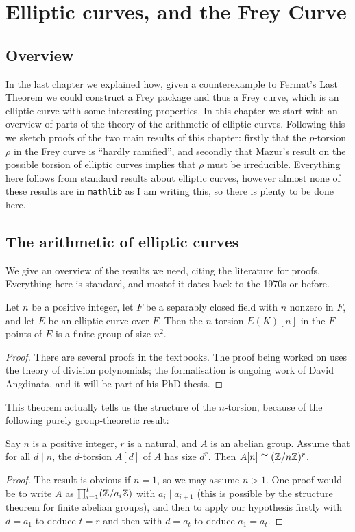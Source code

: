 \chapter{Elliptic curves, and the Frey Curve}

\section{Overview}

In the last chapter we explained how, given a counterexample to Fermat's Last Theorem we could construct a Frey package and thus a Frey curve, which is an elliptic curve with some interesting properties. In this chapter we start with an overview of parts of the theory of the arithmetic of elliptic curves. Following
this we sketch proofs of the two main results of this chapter: firstly that the $p$-torsion $\rho$ in the Frey curve is ``hardly ramified'', and secondly that Mazur's result on the possible torsion of elliptic curves implies that $\rho$ must be irreducible. Everything here follows from standard results about elliptic curves, however almost none of these results are in {\tt mathlib} as I am writing this, so there is plenty to be done here.

\section{The arithmetic of elliptic curves}

We give an overview of the results we need, citing the literature for proofs. Everything here is
 standard, and mostof it dates back to the 1970s or before.

\begin{theorem}\label{EllipticCurve.n_torsion_card}\notready
  Let $n$ be a positive integer, let $F$ be a separably closed
  field with $n$ nonzero in $F$, and let $E$ be an elliptic curve over $F$. Then the $n$-torsion $E(K)[n]$ 
  in the $F$-points of $E$ is a finite group of size $n^2$.
\end{theorem}
\begin{proof}
  There are several proofs in the textbooks. The proof being worked on uses the theory of division polynomials; the formalisation is ongoing work of David Angdinata, and it will be part of his PhD thesis.
\end{proof}

This theorem actually tells us the structure of the $n$-torsion, because of the following
purely group-theoretic result:
\begin{lemma}\label{group_theory_lemma}
  Say $n$ is a positive integer, $r$ is a natural, and $A$ is an abelian group. Assume that for all $d\mid n$, the $d$-torsion $A[d]$ of $A$ has size $d^r$. Then $A[n]\cong (\mathbb{Z}/n\mathbb{Z})^r$. 
\end{lemma}
\begin{proof}
  The result is obvious if $n=1$, so we may assume $n>1$. One proof would be to write $A$ as $\prod_{i=1}^t(\mathbb{Z}/a_i\mathbb{Z})$
  with $a_i\mid a_{i+1}$ (this is possible by the structure theorem for finite abelian groups), and then to apply our hypothesis firstly with $d=a_1$ to deduce $t=r$ and then with $d=a_t$ to deduce $a_1=a_t$.
\end{proof}

